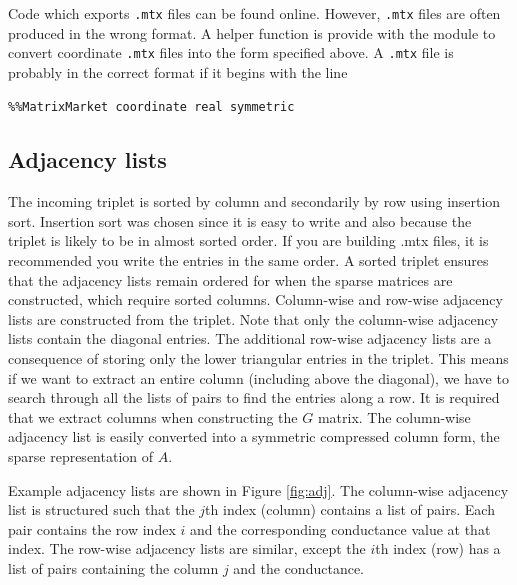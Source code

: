 \documentclass[11pt]{article}
\begin{document}
Code which exports \texttt{.mtx} files can be found online. However, \texttt{.mtx} files are often produced in the wrong format. A helper function is provide with the module to convert coordinate \texttt{.mtx} files into the form specified above. A \texttt{.mtx} file is probably in the correct format if it begins with the line

\begin{verbatim}
%%MatrixMarket coordinate real symmetric
\end{verbatim}

\subsection{Adjacency lists}
The incoming triplet is sorted by column and secondarily by row using insertion sort. Insertion sort was chosen since it is easy to write and also because the triplet is likely to be in almost sorted order. If you are building .mtx files, it is recommended you write the entries in the same order. A sorted triplet ensures that the adjacency lists remain ordered for when the sparse matrices are constructed, which require sorted columns. Column-wise and row-wise adjacency lists are constructed from the triplet. Note that only the column-wise adjacency lists contain the diagonal entries. The additional row-wise adjacency lists are a consequence of storing only the lower triangular entries in the triplet. This means if we want to extract an entire column (including above the diagonal), we have to search through all the lists of pairs to find the entries along a row. It is required that we extract columns when constructing the $G$ matrix. The column-wise adjacency list is easily converted into a symmetric compressed column form, the sparse representation of $A$.

Example adjacency lists are shown in Figure \ref{fig:adj}. The column-wise adjacency list is structured such that the $j$th index (column) contains a list of pairs. Each pair contains the row index $i$ and the corresponding conductance value at that index. The row-wise adjacency lists are similar, except the $i$th index (row) has a list of pairs containing the column $j$ and the conductance.
\end{document}
